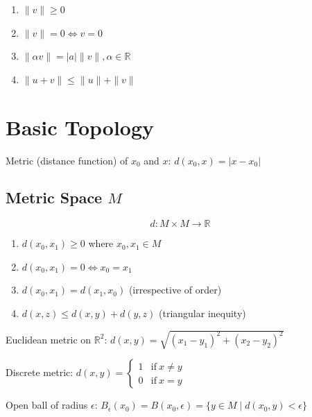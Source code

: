 \documentclass{article}
\newcommand{\abs}[1]{\left| #1 \right|}
\newcommand{\norm}[1]{\| #1 \|}
\begin{document}
    \begin{enumerate}
        \item $\norm{v} \geq 0$
        \item $\norm{v} = 0 \iff v = 0$
        \item $\norm{\alpha v} = \abs{a} \norm{v}, \alpha \in \mathbb{R}$
        \item $\norm{u + v} \leq \norm{u} + \norm{v}$
    \end{enumerate}
    
    \section{Basic Topology}

        Metric (distance function) of $x_{0}$ and $x$: $d(x_{0}, x) = \lvert x - x_{0} \rvert$

    \subsection{Metric Space $M$}

        \begin{displaymath}
        d \colon M \times M \to \mathbb{R}
        \end{displaymath}

        \begin{enumerate}
            \item $d(x_{0}, x_{1}) \geq 0$ where $x_{0}, x_{1} \in M$
            \item $d(x_{0}, x_{1}) = 0 \iff x_{0} = x_{1}$
            \item $d(x_{0}, x_{1}) = d(x_{1}, x_{0})$ (irrespective of order)
            \item $d(x, z) \leq d(x, y) + d(y, z)$ (triangular inequity)
        \end{enumerate}

        Euclidean metric on $\mathbb{R}^{2}$:
        $d(x, y) = \sqrt{(x_{1} - y_{1})^{2} + (x_{2} - y_{2})^{2}}$

        Discrete metric: $d(x, y) = \left\{\begin{matrix}
        1 &\mbox{if}\ x \neq y \\
        0 &\mbox{if}\ x = y 
        \end{matrix}\right.$

        Open ball of radius $\epsilon$:
        $B_{\epsilon}(x_{0}) = B(x_{0}, \epsilon) = \{ y \in M \mid d(x_{0}, y) < \epsilon \}$
\end{document}
